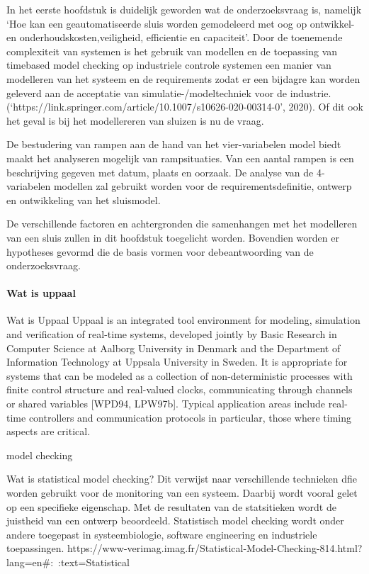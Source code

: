 
 




In het eerste hoofdstuk is duidelijk geworden wat de onderzoeksvraag is, namelijk ‘Hoe kan een geautomatiseerde sluis worden gemodeleerd met oog op ontwikkel- en onderhoudskosten,veiligheid, efficientie en capaciteit’. Door de toenemende complexiteit van systemen is het gebruik van modellen en de toepassing van timebased model checking  op industriele controle systemen een manier van modelleren van het systeem en de requirements zodat er een bijdagre kan worden geleverd aan de acceptatie van  simulatie-/modeltechniek voor de industrie.(‘https://link.springer.com/article/10.1007/s10626-020-00314-0’, 2020). Of dit ook het geval is bij het modellereren van sluizen is nu de vraag.

De bestudering van rampen aan de hand van het vier-variabelen model biedt maakt het analyseren mogelijk van rampsituaties. Van een aantal rampen is een beschrijving gegeven met datum, plaats en oorzaak. De analyse van de 4-variabelen modellen zal gebruikt worden voor de requirementsdefinitie, ontwerp en ontwikkeling van het sluismodel. 

De verschillende factoren en achtergronden die  samenhangen met het modelleren van een sluis zullen in dit hoofdstuk toegelicht worden. Bovendien worden er hypotheses gevormd die de basis vormen voor debeantwoording van de onderzoeksvraag. 




\paragraph{Wat is uppaal}

Wat is Uppaal
Uppaal is an integrated tool environment for modeling, simulation and verification of real-time systems, developed jointly by Basic Research in Computer Science at Aalborg University in Denmark and the Department of Information Technology at Uppsala University in Sweden. It is appropriate for systems that can be modeled as a collection of non-deterministic processes with finite control structure and real-valued clocks, communicating through channels or shared variables [WPD94, LPW97b]. Typical application areas include real-time controllers and communication protocols in particular, those where timing aspects are critical.


model checking

Wat is statistical model checking?
Dit verwijst naar verschillende technieken dfie worden gebruikt voor de monitoring van een systeem. Daarbij wordt vooral gelet op een specifieke eigenschap. Met de resultaten van de statsitieken wordt de juistheid van een ontwerp beoordeeld. Statistisch model checking wordt onder andere toegepast in systeembiologie, software engineering en industriele toepassingen.
https://www-verimag.imag.fr/Statistical-Model-Checking-814.html?lang=en#:~:text=Statistical%



